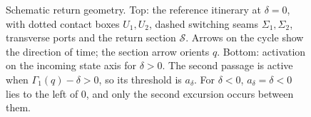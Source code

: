 \begin{figure}[!htbp]
  \caption{Schematic return geometry. Top: the reference itinerary at
    $\delta=0$, with dotted contact boxes $U_1,U_2$, dashed switching seams
    $\Sigma_1,\Sigma_2$, transverse ports and the return section
    $\mathcal S$. Arrows on the cycle show the direction of time; the
    section arrow orients $q$. Bottom:
    activation on the incoming state axis for $\delta>0$. The second
    passage is active when $\Gamma_1(q)-\delta>0$, so its threshold is
    $a_\delta$. For $\delta<0$, $a_\delta=\delta<0$ lies to the left of
    $0$, and only the second excursion occurs between them.}
  \label{fig:actual-return-geometry}
\end{figure}
